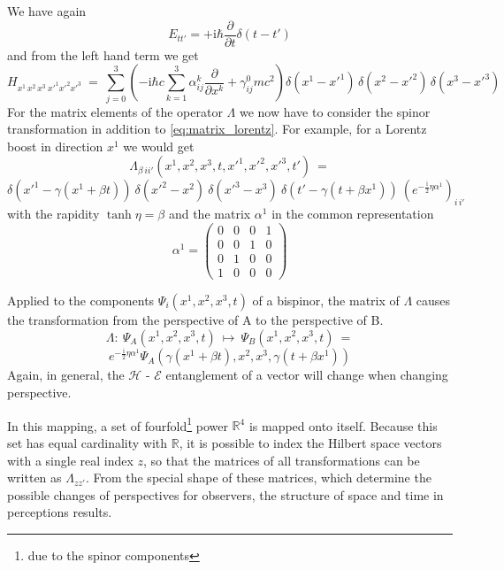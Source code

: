 \documentclass[12pt]{article}
\begin{document}
We have again
\begin{equation*}
E_{tt'} = +\mathrm {i} \hbar \frac{\partial }{\partial t}\delta(t-t')
\end{equation*} 
and from the left hand term we get
\begin{equation*}
H_{x^1\,x^2\,x^3\ {x'}^1{x'}^2{x'}^3}\ =\ 
\sum_{j=0}^{3}\left(-\mathrm{i}\hbar c \sum_{k=1}^{3}\alpha^{k}_{ij}\frac{\partial }{\partial x^k}+\gamma^{0}_{ij} m c^2 \right) 
\delta(x^1-{x'}^1)\,\delta(x^2-{x'}^2)\,\delta(x^3-{x'}^3)
\end{equation*} 
For the matrix elements of the operator $\Lambda$ we now have to consider the spinor transformation in addition to \eqref{eq:matrix_lorentz}. For example, for a Lorentz boost in direction $x^1$ we would get
\begin{equation*}
\Lambda_{\beta\ ii'}(x^1,x^2,x^3,t,{x'}^1,{x'}^2,{x'}^3,t')\ =
\end{equation*}
\begin{equation*}
\delta({x'}^1-\gamma(x^1+\beta t))\ 
\delta({x'}^2-x^2)\ 
\delta({x'}^3-x^3)\ 
\delta(t'-\gamma(t+\beta x^1))\ 
\left( e^{-\frac{\mathrm{i}}{2}\eta\alpha^1} \right)_{i\,i'}
\end{equation*}
with the rapidity $\tanh \eta = \beta$ and the matrix $\alpha^1$ in the common representation
\begin{equation*}
\alpha^1 = \begin{pmatrix}
0 & 0 & 0 & 1 \\
0 & 0 & 1 & 0 \\
0 & 1 & 0 & 0 \\
1 & 0 & 0 & 0 
\end{pmatrix}
\end{equation*}

Applied to the components $\Psi_i(x^1,x^2,x^3,t)$ of a bispinor, the matrix of $\Lambda$ causes the transformation from the perspective of A to the perspective of B.
\begin{equation*}
\Lambda:\ \Psi_A(x^1,x^2,x^3,t)\ \mapsto\ \Psi_B(x^1,x^2,x^3,t)\ =
\end{equation*}
\begin{equation*}
e^{-\frac{\mathrm{i}}{2}\eta\alpha^1} \Psi_{A}\left(\gamma(x^1+\beta t),x^2,x^3,\gamma(t+\beta x^1)\right)
\end{equation*}
Again, in general, the $\mathscr{H}$ - $\mathscr{E}$ entanglement of a vector will change when changing perspective.

In this mapping, a set of fourfold\footnote{due to the spinor components} power $\mathbb{R}^4$ is mapped onto itself. Because this set has equal cardinality with $\mathbb{R}$, it is possible to index the Hilbert space vectors with a single real index $z$, so that the matrices of all transformations can be written as $\Lambda_{zz'}$. From the special shape of these matrices, which determine the possible changes of perspectives for observers, the structure of space and time in perceptions results.
\end{document}
